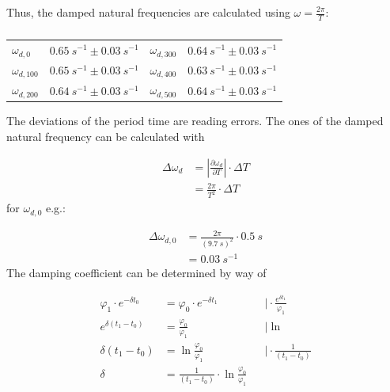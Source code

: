         Thus, the damped natural frequencies are calculated using $ \omega=\frac{2\pi}{T} $:\par
        \begin{table}[h]
            \centering
            \caption[Damped natural frequencies]{}
            \begin{tabular}{@{}llll@{}}
                \toprule
                $\omega_{d,0}$      &$\SI{0.65}{s^{-1}} \pm \SI{0.03}{s^{-1}}$  &\hspace{10mm}$\omega_{d,300}$  &$\SI{0.64}{s^{-1}} \pm \SI{0.03}{s^{-1}}$\\
                $\omega_{d,100}$    &$\SI{0.65}{s^{-1}} \pm \SI{0.03}{s^{-1}}$  &\hspace{10mm}$\omega_{d,400}$  &$\SI{0.63}{s^{-1}} \pm \SI{0.03}{s^{-1}}$\\
                $\omega_{d,200}$    &$\SI{0.64}{s^{-1}} \pm \SI{0.03}{s^{-1}}$  &\hspace{10mm}$\omega_{d,500}$  &$\SI{0.64}{s^{-1}} \pm \SI{0.03}{s^{-1}}$\\
                \bottomrule
            \end{tabular}
            \label{tab:damped_natural_frequencies}
        \end{table}
        The deviations of the period time are reading errors. The ones of the damped natural frequency can be calculated with\par
        \begin{align}
            \Delta \omega_d &=\left|\frac{\partial \omega_d}{\partial T}\right| \cdot \Delta T \nonumber \\
                            &=\frac{2\pi}{T^2}\cdot \Delta T
        \end{align}
        for $ \omega_{d,0} $ e.g.:\par
        \begin{align}
            \Delta\omega_{d,0}  &=\frac{2\pi}{(\SI{9.7}{s})^2}\cdot \SI{0.5}{s} \nonumber \\
                                &=\SI{0.03}{s^{-1}}
        \end{align}
        The damping coefficient can be determined by way of\par
        \begin{align}
            \varphi_1 \cdot e^{-\delta t_0} &=\varphi_0 \cdot e^{-\delta t_1}   &&\Bigg|\cdot \frac{e^{\delta t_1}}{\varphi_1} \nonumber\\
            e^{\delta(t_1-t_0)}             &=\frac{\varphi_0}{\varphi_1}       &&\Bigg|\ln \nonumber\\
            \delta(t_1-t_0)                 &=\ln{\frac{\varphi_0}{\varphi_1}}  &&\Bigg|\cdot \frac{1}{(t_1-t_0)} \nonumber\\
            \delta                          &=\frac{1}{(t_1-t_0)}\cdot\ln{\frac{\varphi_0}{\varphi_1}}
        \end{align}
